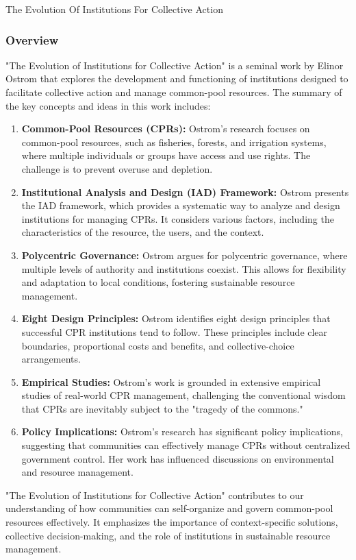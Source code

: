 \begin{notes}{The Evolution Of Institutions For Collective Action}
    \subsubsection*{Overview}

    "The Evolution of Institutions for Collective Action" is a seminal work by Elinor Ostrom that explores the development and functioning of institutions designed to facilitate collective action and 
    manage common-pool resources. The summary of the key concepts and ideas in this work includes:

    \begin{enumerate}
        \item \textbf{Common-Pool Resources (CPRs):} Ostrom's research focuses on common-pool resources, such as fisheries, forests, and irrigation systems, where multiple individuals or groups have 
        access and use rights. The challenge is to prevent overuse and depletion.
        \item \textbf{Institutional Analysis and Design (IAD) Framework:} Ostrom presents the IAD framework, which provides a systematic way to analyze and design institutions for managing CPRs. It 
        considers various factors, including the characteristics of the resource, the users, and the context.
        \item \textbf{Polycentric Governance:} Ostrom argues for polycentric governance, where multiple levels of authority and institutions coexist. This allows for flexibility and adaptation to 
        local conditions, fostering sustainable resource management.
        \item \textbf{Eight Design Principles:} Ostrom identifies eight design principles that successful CPR institutions tend to follow. These principles include clear boundaries, proportional costs 
        and benefits, and collective-choice arrangements.
        \item \textbf{Empirical Studies:} Ostrom's work is grounded in extensive empirical studies of real-world CPR management, challenging the conventional wisdom that CPRs are inevitably subject 
        to the "tragedy of the commons."
        \item \textbf{Policy Implications:} Ostrom's research has significant policy implications, suggesting that communities can effectively manage CPRs without centralized government control. Her 
        work has influenced discussions on environmental and resource management.
    \end{enumerate}
    
    "The Evolution of Institutions for Collective Action" contributes to our understanding of how communities can self-organize and govern common-pool resources effectively. It emphasizes the importance 
    of context-specific solutions, collective decision-making, and the role of institutions in sustainable resource management.
\end{notes}